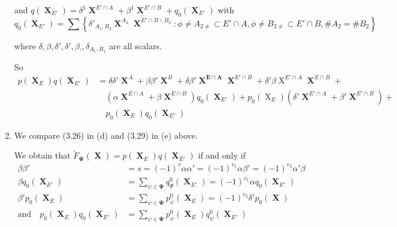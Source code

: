 \documentclass[a4paper,12pt]{article}
\DeclareMathOperator{\x}{\mathrm{X}}
\theoremstyle{definition}
\theoremstyle{underlinethm}
\theoremstyle{definition}
\begin{document}
\begin{enumerate}[label=(\alph*)]
and $q(\boldsymbol{\x}_{E'}) = \delta^{1} \boldsymbol{\x}^{E' \cap A} + \beta^{1} \boldsymbol{\x}^{E' \cap B} + q_{0}(\boldsymbol{\x}_{E'})$ with
\begin{equation}
q_{0}(\boldsymbol{\x}_{E'}) = \sum \left\{\delta'_{A_{1}, B_{2}} \boldsymbol{\x}^{A_{2}} \boldsymbol{\x}^{E' \cap B \smallsetminus B_{2}} : \phi \neq A_{2 \neq} \subset E' \cap A, \phi \neq B_{2 \neq} \subset E' \cap B, \# A_{2} = \# B_{2}\right\}\tag{3.28}
\end{equation}

where $\delta, \beta, \delta', \delta{'}, \beta_{'}, \delta_{A_{1}, B_{1}}$ are all scalars.

So
\begin{align*}
p(\boldsymbol{\x}_{E}) q (\boldsymbol{\x}_{E'}) &= \delta \delta' \boldsymbol{\x}^{A} + \beta \beta' \boldsymbol{\x}^{B} + \delta \beta' \boldsymbol{\x^{E \cap A}} \boldsymbol{\x}^{E' \cap B} + \delta'\beta \x^{E' \cap A} \boldsymbol{\x}^{E \cap B} +\\
&\quad(\alpha \boldsymbol{\x}^{E \cap A} + \beta \boldsymbol{\x}^{E \cap B}) q_{0}(\boldsymbol{\x}_{E'}) + p_{0}(\x_{E}) (\delta' \boldsymbol{\x}^{E' \cap A} +\beta' \boldsymbol{\x}^{E' \cap B}) +\\
&\quad p_{0}(\boldsymbol{\x}_{E}) q_{0}(\boldsymbol{\x}_{E'})\tag{3.29}
\end{align*}
 
\item We compare (3.26) in (d) and (3.29) in (e) above. 

We obtain that $\widetilde{F}_{\boldsymbol\Psi}(\boldsymbol{\x}) = p(\boldsymbol{\x}_{E}) q(\boldsymbol{\x}_{E'})$ if and only if
\begin{align*}
\beta \beta' &= s = (-1)^{v} \alpha \alpha' = (-1)^{v_{1}} \alpha \beta' = (-1)^{v_{2}} \alpha' \beta\tag{3.30}\label{eq-3.30}\\
\beta q_{0}(\boldsymbol{\x}_{E'}) &= \sum_{\psi \in \boldsymbol{\Psi}} q_{\Psi}^{0}(\boldsymbol{\x}_{E'}) = (-1)^{v_{1}} \alpha q_{0} (\boldsymbol{\x}_{E'})\tag{3.31}\label{eq-3.31}\\
\beta' p_{0}(\boldsymbol{\x}_{E}) &= \sum_{\psi \in \boldsymbol{\Psi}} p^{0}_{\psi} (\boldsymbol{\x}_{E}) = (-1)^{v_{2}} \delta' p_{0} (\boldsymbol{\x})\tag{3.32}\label{eq-3.32}\\
 \text{and}\quad p_{0}(\boldsymbol{\x}_{E}) q_{0}(\boldsymbol{\x}_{E'}) &= \sum_{\psi \in \boldsymbol{\Psi}} p^{0}_{\psi} (\boldsymbol{\x}_{E}) q^{0}_{\psi} (\boldsymbol{\x}_{E'}) \tag{3.33}\label{eq-3.33}
\end{align*}
 

\end{enumerate}
\end{document}
